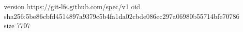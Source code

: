 version https://git-lfs.github.com/spec/v1
oid sha256:5be86cbfd4514897a9379c5b4fa1da02cbde086cc297a06980b55714bfe70786
size 7707
